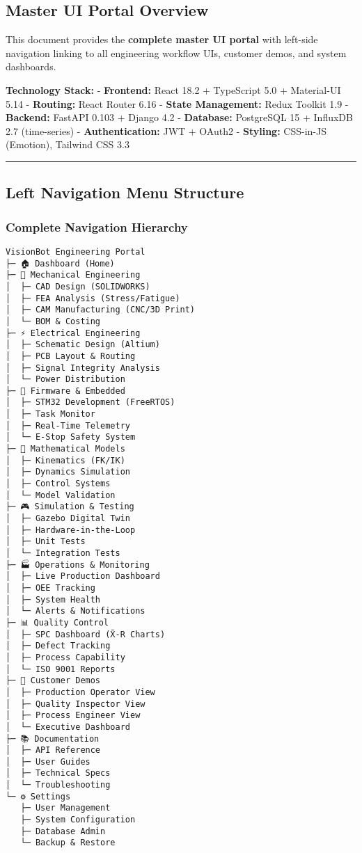 \documentclass[
]{article}
\begin{document}
\hypertarget{master-ui-portal-overview}{%
\subsection{Master UI Portal Overview}\label{master-ui-portal-overview}}

This document provides the \textbf{complete master UI portal} with
left-side navigation linking to all engineering workflow UIs, customer
demos, and system dashboards.

\textbf{Technology Stack:} - \textbf{Frontend:} React 18.2 + TypeScript
5.0 + Material-UI 5.14 - \textbf{Routing:} React Router 6.16 -
\textbf{State Management:} Redux Toolkit 1.9 - \textbf{Backend:} FastAPI
0.103 + Django 4.2 - \textbf{Database:} PostgreSQL 15 + InfluxDB 2.7
(time-series) - \textbf{Authentication:} JWT + OAuth2 -
\textbf{Styling:} CSS-in-JS (Emotion), Tailwind CSS 3.3

\begin{center}\rule{0.5\linewidth}{0.5pt}\end{center}

\hypertarget{left-navigation-menu-structure}{%
\subsection{Left Navigation Menu
Structure}\label{left-navigation-menu-structure}}

\hypertarget{complete-navigation-hierarchy}{%
\subsubsection{Complete Navigation
Hierarchy}\label{complete-navigation-hierarchy}}

\begin{verbatim}
VisionBot Engineering Portal
├─ 🏠 Dashboard (Home)
├─ 📐 Mechanical Engineering
│  ├─ CAD Design (SOLIDWORKS)
│  ├─ FEA Analysis (Stress/Fatigue)
│  ├─ CAM Manufacturing (CNC/3D Print)
│  └─ BOM & Costing
├─ ⚡ Electrical Engineering
│  ├─ Schematic Design (Altium)
│  ├─ PCB Layout & Routing
│  ├─ Signal Integrity Analysis
│  └─ Power Distribution
├─ 🔧 Firmware & Embedded
│  ├─ STM32 Development (FreeRTOS)
│  ├─ Task Monitor
│  ├─ Real-Time Telemetry
│  └─ E-Stop Safety System
├─ 🧮 Mathematical Models
│  ├─ Kinematics (FK/IK)
│  ├─ Dynamics Simulation
│  ├─ Control Systems
│  └─ Model Validation
├─ 🎮 Simulation & Testing
│  ├─ Gazebo Digital Twin
│  ├─ Hardware-in-the-Loop
│  ├─ Unit Tests
│  └─ Integration Tests
├─ 🏭 Operations & Monitoring
│  ├─ Live Production Dashboard
│  ├─ OEE Tracking
│  ├─ System Health
│  └─ Alerts & Notifications
├─ 📊 Quality Control
│  ├─ SPC Dashboard (X̄-R Charts)
│  ├─ Defect Tracking
│  ├─ Process Capability
│  └─ ISO 9001 Reports
├─ 👥 Customer Demos
│  ├─ Production Operator View
│  ├─ Quality Inspector View
│  ├─ Process Engineer View
│  └─ Executive Dashboard
├─ 📚 Documentation
│  ├─ API Reference
│  ├─ User Guides
│  ├─ Technical Specs
│  └─ Troubleshooting
└─ ⚙️ Settings
   ├─ User Management
   ├─ System Configuration
   ├─ Database Admin
   └─ Backup & Restore
\end{verbatim}
\end{document}
